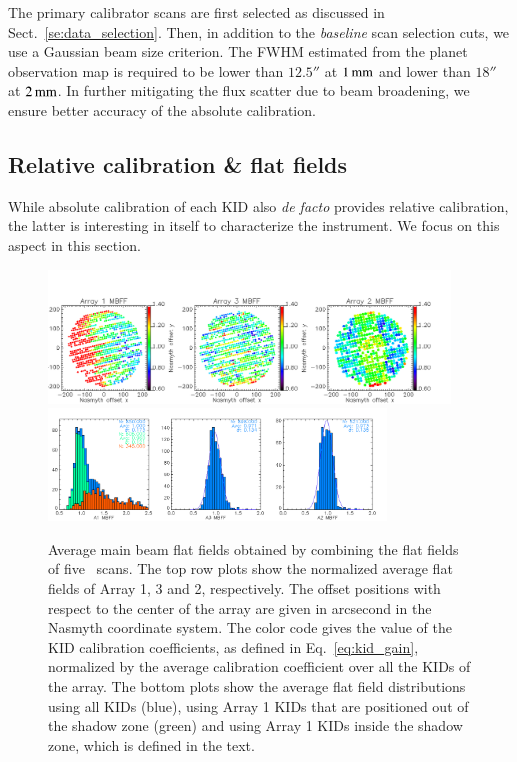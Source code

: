 The primary calibrator scans are first selected as discussed in
Sect.~\ref{se:data_selection}. Then, in addition to
the \emph{baseline} scan selection cuts, we use a Gaussian beam size
criterion. The FWHM estimated from the planet
observation map is required to be lower than $12.5''$ at $1\,\rm{mm}$ and lower
than $18''$ at $2\,\rm{mm}$. In further mitigating the flux scatter
due to beam broadening, we ensure better accuracy of the absolute
calibration.



\subsection{Relative calibration \& flat fields}
\label{se:flat_field}
While absolute calibration of each KID also \emph{de facto} provides
relative calibration, the latter is interesting in itself to
characterize the instrument. We focus on this aspect in this
section.

\begin{figure}[!thbp] 
\begin{center}
  \includegraphics[width=0.95\textwidth]{Figures/Average_main_beam_flat_field_N2R9_10.png}
  \includegraphics[width=0.8\textwidth]{Figures/Histo_average_main_beam_flat_field_N2R9_10.png}
\caption[Average main beam flat fields]{Average main beam flat fields
  obtained by combining the flat fields of five
  \bm\ scans. The top row plots show the normalized average flat fields of Array
  1, 3 and 2, respectively. {\lp The offset positions with respect to the center of
  the array are given in arcsecond in the Nasmyth coordinate
  system. The color code gives the value of the KID calibration
  coefficients, as defined in Eq.~\ref{eq:kid_gain}, normalized by the
  average calibration coefficient over all the
  KIDs of the array.} The bottom plots
  show the average flat field distributions using all KIDs (blue),
  using Array 1 KIDs that are positioned out of the shadow zone
  (green) and using Array 1 KIDs inside the shadow zone, which is
  defined in the text.}
 \label{fig:avg_mbff}
\end{center}
\end{figure}

